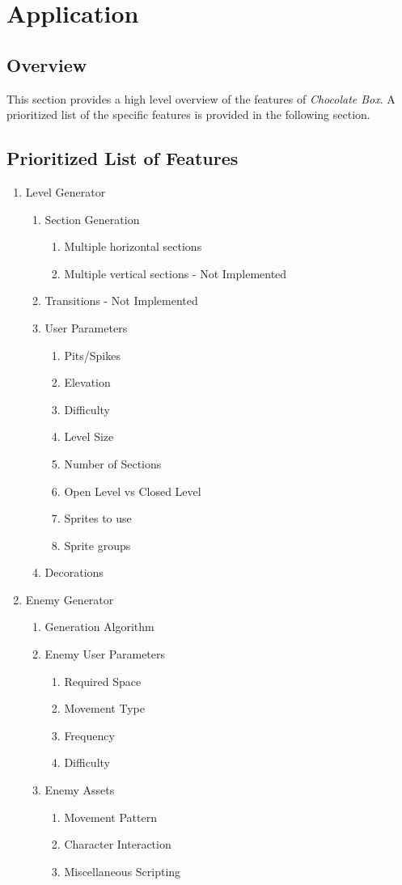 \documentclass[pdftex,12pt,letter]{article}
\begin{document}
\section{Application}
\subsection{Overview}
This section provides a high level overview of the features of \textit{Chocolate Box}. A prioritized list of the specific features is provided in the following section.

\subsection{Prioritized List of Features}
\begin{enumerate}
\item Level Generator
\begin{enumerate}
\item Section Generation
\begin{enumerate}
\item Multiple horizontal sections
\item Multiple vertical sections - Not Implemented
\end{enumerate}
\item Transitions - Not Implemented
\item User Parameters
\begin{enumerate}
\item Pits/Spikes
\item Elevation
\item Difficulty
\item Level Size
\item Number of Sections
\item Open Level vs Closed Level
\item Sprites to use
\item Sprite groups
\end{enumerate}
\item Decorations
\end{enumerate}

\item Enemy Generator
\begin{enumerate}
\item Generation Algorithm
\item Enemy User Parameters
\begin{enumerate}
\item Required Space
\item Movement Type
\item Frequency
\item Difficulty
\end{enumerate}
\item Enemy Assets
\begin{enumerate}
\item Movement Pattern
\item Character Interaction
\item Miscellaneous Scripting
\end{enumerate}
\end{enumerate}


\end{enumerate}
\end{document}
